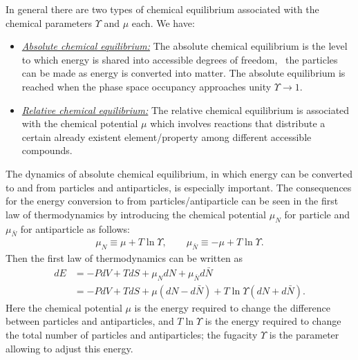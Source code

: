 In general there are two types of chemical equilibrium associated with the chemical parameters $\Upsilon$ and $\mu$ each. We have:
\begin{itemize}
\item \underline{\it Absolute chemical equilibrium:\/} 
The absolute chemical equilibrium is the level to which energy is shared into accessible degrees of freedom, \eg\ the particles can be made as energy is converted into matter.
The absolute equilibrium is reached when the phase space occupancy approaches unity $\Upsilon\to1$. 
 \item \underline{\it Relative chemical equilibrium:\/}
 The relative chemical equilibrium is associated with the chemical potential $\mu$ which involves reactions that distribute a certain already existent element/property among different accessible compounds. 
 \end{itemize}
The dynamics of absolute chemical equilibrium, in which energy can be converted to and from particles and antiparticles, is especially important. The consequences for the energy conversion to from particles/antiparticle can be seen in the first law of thermodynamics by introducing the chemical potential $\mu_N$ for particle and $\mu_{\bar{N}}$ for antiparticle as follows:
\begin{align}
\mu_N\equiv\mu+T\ln\Upsilon,\qquad{\mu_{\bar{N}}}\equiv{-\mu}+T\ln\Upsilon.
\end{align}
Then the first law of thermodynamics can be written as
\begin{align}
dE&=-PdV+TdS+{\mu_N}dN+{\mu_{\bar{N}}}d{\bar{N}}
\\&=-PdV+TdS+{\mu}(dN-d{\bar{N}})+T\ln{\Upsilon}(dN+d{\bar{N}}).
\end{align}
Here the chemical potential $\mu$ is the energy required to change the difference between particles and antiparticles, and $T\ln\Upsilon$ is the energy required to change the total number of particles and antiparticles; the fugacity $\Upsilon$ is the parameter allowing to adjust this energy.

